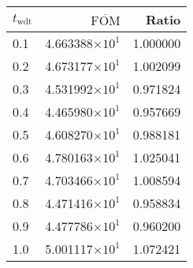 \begin{tabular}{lrr}
\toprule
$t_{\mathrm{wdt}}$ & $\overline{\mathrm{FOM}}$ &    Ratio \\
\midrule
               0.1 &   4.663388$\times 10^{1}$ & 1.000000 \\
               0.2 &   4.673177$\times 10^{1}$ & 1.002099 \\
               0.3 &   4.531992$\times 10^{1}$ & 0.971824 \\
               0.4 &   4.465980$\times 10^{1}$ & 0.957669 \\
               0.5 &   4.608270$\times 10^{1}$ & 0.988181 \\
               0.6 &   4.780163$\times 10^{1}$ & 1.025041 \\
               0.7 &   4.703466$\times 10^{1}$ & 1.008594 \\
               0.8 &   4.471416$\times 10^{1}$ & 0.958834 \\
               0.9 &   4.477786$\times 10^{1}$ & 0.960200 \\
               1.0 &   5.001117$\times 10^{1}$ & 1.072421 \\
\bottomrule
\end{tabular}
